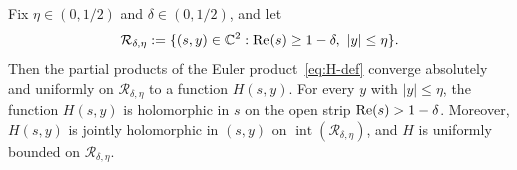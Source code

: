 
\begin{proposition}\label{prop:H-analytic}
Fix $\eta \in (0, 1/2)$ and $\delta \in (0, 1/2)$, and let
\begin{equation}\label{eq:H-region}
    \mathcal{R}_{\delta, \eta} := \{(s, y) \in \mathbb{C}^2 :
    \operatorname{Re}(s) \geq 1 - \delta, \ |y| \leq \eta\}.
\end{equation}
Then the partial products of the Euler product~\eqref{eq:H-def}
converge absolutely and uniformly on $\mathcal{R}_{\delta, \eta}$
to a function $H(s, y)$. For every $y$ with $|y| \leq \eta$, the
function $H(s, y)$ is holomorphic in $s$ on the open strip
$\operatorname{Re}(s) > 1 - \delta$. Moreover, $H(s, y)$ is jointly holomorphic
in $(s, y)$ on $\operatorname{int}(\mathcal{R}_{\delta, \eta})$,
and $H$ is uniformly bounded on $\mathcal{R}_{\delta, \eta}$.
\end{proposition}

